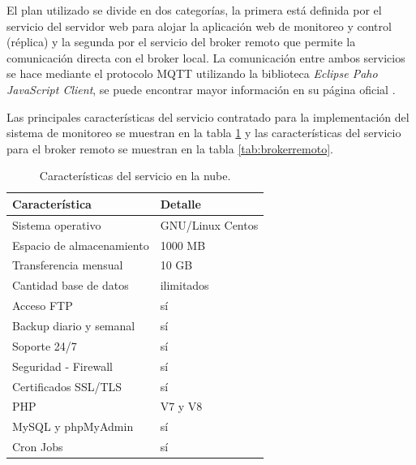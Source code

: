 El plan utilizado se divide en dos categorías, la primera está definida por el servicio del servidor web para alojar la aplicación web de monitoreo y control (réplica) y la segunda por el servicio del broker remoto que permite la comunicación directa con el broker local. La comunicación entre ambos servicios se hace mediante el protocolo MQTT utilizando la biblioteca  \emph{Eclipse Paho JavaScript Client}, se puede encontrar mayor información en su página oficial \citep{WEBSITE:41}. 

Las principales características  del servicio contratado para la implementación del sistema de monitoreo se muestran en la tabla \ref{tab:serverweb} y las características del servicio para el broker remoto se muestran en la tabla  \ref{tab:brokerremoto}.


\begin{table}[h]
	\centering
	\caption[Características del servicio en la nube]{Características del servicio en la nube.}
	\begin{tabular}{p{7cm} p{5cm} }    
		\toprule
		\textbf{Característica} 	 & \textbf{Detalle}  \\
		\midrule
		Sistema operativo  & GNU/Linux Centos\\		
		Espacio de almacenamiento & 1000 MB \\
		Transferencia mensual  & 10 GB\\				
		Cantidad base de datos 	  & ilimitados\\
		Acceso FTP 	  & sí\\
		Backup diario y semanal 	  & sí\\
		Soporte 24/7 	  & sí\\
		Seguridad - Firewall	  & sí\\
		Certificados SSL/TLS	  & sí\\
		PHP	  & V7 y V8\\
		MySQL y	phpMyAdmin  & sí\\
		Cron Jobs	  & sí\\
		\bottomrule
		\hline
	\end{tabular}
	\label{tab:serverweb}
\end{table}


